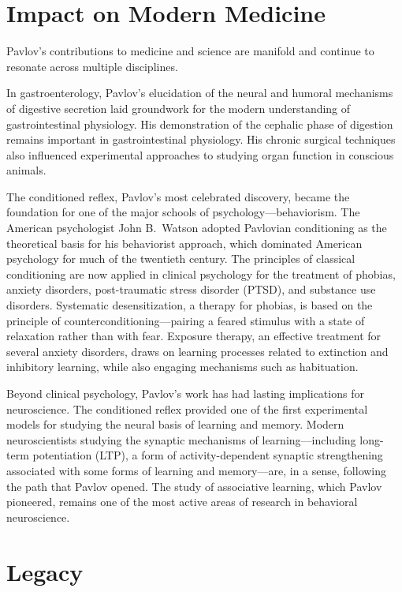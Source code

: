 \section{Impact on Modern Medicine}

Pavlov's contributions to medicine and science are manifold and continue to resonate across multiple disciplines.

In gastroenterology, Pavlov's elucidation of the neural and humoral mechanisms of digestive secretion laid groundwork for the modern understanding of gastrointestinal physiology. His demonstration of the cephalic phase of digestion remains important in gastrointestinal physiology. His chronic surgical techniques also influenced experimental approaches to studying organ function in conscious animals.\cite{pavlov-physiology}

The conditioned reflex, Pavlov's most celebrated discovery, became the foundation for one of the major schools of psychology---behaviorism. The American psychologist John B.\ Watson adopted Pavlovian conditioning as the theoretical basis for his behaviorist approach, which dominated American psychology for much of the twentieth century. The principles of classical conditioning are now applied in clinical psychology for the treatment of phobias, anxiety disorders, post-traumatic stress disorder (PTSD), and substance use disorders. Systematic desensitization, a therapy for phobias, is based on the principle of counterconditioning---pairing a feared stimulus with a state of relaxation rather than with fear. Exposure therapy, an effective treatment for several anxiety disorders, draws on learning processes related to extinction and inhibitory learning, while also engaging mechanisms such as habituation.

Beyond clinical psychology, Pavlov's work has had lasting implications for neuroscience. The conditioned reflex provided one of the first experimental models for studying the neural basis of learning and memory. Modern neuroscientists studying the synaptic mechanisms of learning---including long-term potentiation (LTP), a form of activity-dependent synaptic strengthening associated with some forms of learning and memory---are, in a sense, following the path that Pavlov opened. The study of associative learning, which Pavlov pioneered, remains one of the most active areas of research in behavioral neuroscience.

\section{Legacy}

